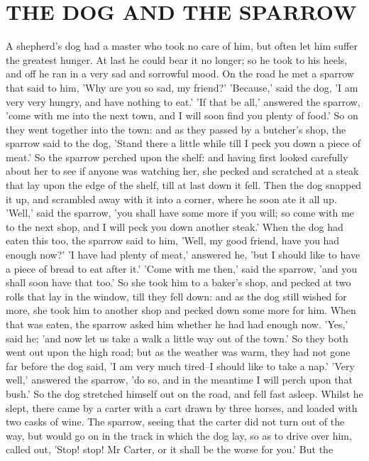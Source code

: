 \documentclass[12pt]{book}
\begin{document}
\chapter{THE DOG AND THE SPARROW}

A shepherd's dog had a master who took no care of him, but often let
him suffer the greatest hunger. At last he could bear it no longer; so
he took to his heels, and off he ran in a very sad and sorrowful mood.
On the road he met a sparrow that said to him, 'Why are you so sad, my
friend?' 'Because,' said the dog, 'I am very very hungry, and have
nothing to eat.' 'If that be all,' answered the sparrow, 'come with me
into the next town, and I will soon find you plenty of food.' So on
they went together into the town: and as they passed by a butcher's
shop, the sparrow said to the dog, 'Stand there a little while till I
peck you down a piece of meat.' So the sparrow perched upon the shelf:
and having first looked carefully about her to see if anyone was
watching her, she pecked and scratched at a steak that lay upon the
edge of the shelf, till at last down it fell. Then the dog snapped it
up, and scrambled away with it into a corner, where he soon ate it all
up. 'Well,' said the sparrow, 'you shall have some more if you will;
so come with me to the next shop, and I will peck you down another
steak.' When the dog had eaten this too, the sparrow said to him,
'Well, my good friend, have you had enough now?' 'I have had plenty of
meat,' answered he, 'but I should like to have a piece of bread to eat
after it.' 'Come with me then,' said the sparrow, 'and you shall soon
have that too.' So she took him to a baker's shop, and pecked at two
rolls that lay in the window, till they fell down: and as the dog
still wished for more, she took him to another shop and pecked down
some more for him. When that was eaten, the sparrow asked him whether
he had had enough now. 'Yes,' said he; 'and now let us take a walk a
little way out of the town.' So they both went out upon the high road;
but as the weather was warm, they had not gone far before the dog
said, 'I am very much tired--I should like to take a nap.' 'Very
well,' answered the sparrow, 'do so, and in the meantime I will perch
upon that bush.' So the dog stretched himself out on the road, and
fell fast asleep. Whilst he slept, there came by a carter with a cart
drawn by three horses, and loaded with two casks of wine. The sparrow,
seeing that the carter did not turn out of the way, but would go on in
the track in which the dog lay, so as to drive over him, called out,
'Stop! stop! Mr Carter, or it shall be the worse for you.' But the
\end{document}
